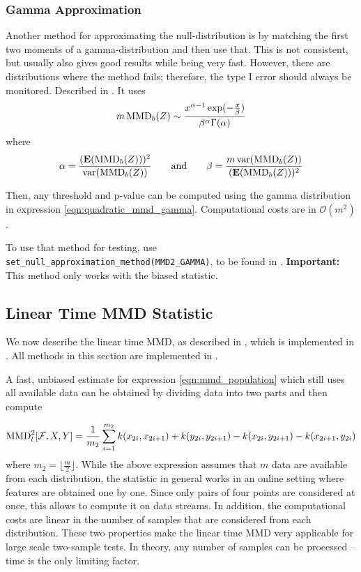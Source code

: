 \subsubsection{Gamma Approximation}
Another method for approximating the null-distribution is by matching the first two moments of a gamma-distribution and then use that. This is not consistent, but usually also gives good results while being very fast. However, there are distributions where the method fails; therefore, the type I error should always be monitored. Described in \citep{Gretton2012b}. It uses
\begin{align}
\label{eqn:quadratic_mmd_gamma}
m\operatorname{MMD}_b(Z) \sim \frac{x^{\alpha-1}\exp(-\frac{x}{\beta})}{\beta^\alpha \Gamma(\alpha)}
\end{align}
where
\begin{align*}
\alpha=\frac{(\textbf{E}(\text{MMD}_b(Z)))^2}{\operatorname{var}(\text{MMD}_b(Z))} \qquad \text{and} \qquad
 \beta=\frac{m \operatorname{var}(\text{MMD}_b(Z))}{(\textbf{E}(\text{MMD}_b(Z)))^2}
\end{align*}

Then, any threshold and p-value can be computed using the gamma distribution in expression \ref{eqn:quadratic_mmd_gamma}. Computational costs are in $\mathcal{O}(m^2)$.

To use that method for testing, use \texttt{set\_null\_approximation\_method(MMD2\_GAMMA)}, to be found in . \textbf{Important:} This method only works with the biased statistic.


\subsection{Linear Time MMD Statistic}
\label{sec:mmd_linear}
We now describe the linear time MMD, as described in \citep[Section
6]{Gretton2012}, which is implemented in \shogun{}. All methods in this section are implemented in .

A fast, unbiased estimate for expression \ref{eqn:mmd_population} which still uses all available data can be obtained by dividing data into two parts and then compute

\begin{align*}
\operatorname{MMD}_l^2[\mathcal{F},X,Y]=\frac{1}{m_2}\sum_{i=1}^{m_2} k(x_{2i},x_{2i+1})+k(y_{2i},y_{2i+1})-k(x_{2i},y_{2i+1})-
  k(x_{2i+1},y_{2i})
\end{align*}
where $ m_2=\lfloor\frac{m}{2} \rfloor$. While the above expression assumes that $m$ data are available from each distribution, the statistic in general works in an online setting where features are obtained one by one. Since only pairs of four points are considered at once, this allows to compute it on data streams. In addition, the computational costs are linear in the number of samples that are considered from each distribution. These two properties make the linear time MMD very applicable for large scale two-sample tests. In theory, any number of samples can be processed -- time is the only limiting factor.

